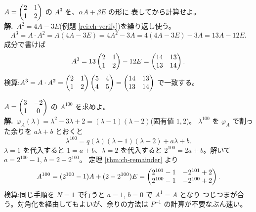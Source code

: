 \begin{rei}[例題・基本(べき下げ)]\label{rei:ch-lower}
$A = \begin{pmatrix}2 & 1 \\ 1 & 2\end{pmatrix}$ の $A^3$ を、$\alpha A + \beta E$ の形に
表してから計算せよ。\\
\textbf{解.}\ $A^2 = 4A - 3E$(例題 \ref{rei:ch-verify})を繰り返し使う。
\[
A^3 = A \cdot A^2 = A(4A - 3E) = 4A^2 - 3A = 4(4A - 3E) - 3A = 13A - 12E.
\]
成分で書けば
\[
A^3 = 13\begin{pmatrix}2 & 1 \\ 1 & 2\end{pmatrix} - 12E = \begin{pmatrix}14 & 13 \\ 13 & 14\end{pmatrix}.
\]
検算:$A^3 = A \cdot A^2 = \begin{pmatrix}2 & 1 \\ 1 & 2\end{pmatrix}\begin{pmatrix}5 & 4 \\ 4 & 5\end{pmatrix}
= \begin{pmatrix}14 & 13 \\ 13 & 14\end{pmatrix}$ で一致する。
\end{rei}

\begin{rei}[例題・標準(余りの方法で $A^{100}$)]\label{rei:ch-power100}
$A = \begin{pmatrix}3 & -2 \\ 1 & 0\end{pmatrix}$ の $A^{100}$ を求めよ。\\
\textbf{解.}\ $\varphi_A(\lambda) = \lambda^2 - 3\lambda + 2
= (\lambda - 1)(\lambda - 2)$(固有値 $1, 2$)。
$\lambda^{100}$ を $\varphi_A$ で割った余りを $a\lambda + b$ とおくと
\[
\lambda^{100} = q(\lambda)(\lambda - 1)(\lambda - 2) + a\lambda + b.
\]
$\lambda = 1$ を代入すると $1 = a + b$、$\lambda = 2$ を代入すると
$2^{100} = 2a + b$。解いて $a = 2^{100} - 1$, $b = 2 - 2^{100}$。
定理 \ref{thm:ch-remainder} より
\[
A^{100} = (2^{100} - 1)A + (2 - 2^{100})E
= \begin{pmatrix}2^{101} - 1 & -2^{101} + 2 \\ 2^{100} - 1 & -2^{100} + 2\end{pmatrix}.
\]
検算:同じ手順を $N = 1$ で行うと $a = 1$, $b = 0$ で $A^1 = A$ となり
つじつまが合う。対角化を経由してもよいが、余りの方法は
$P^{-1}$ の計算が不要なぶん速い。
\end{rei}

